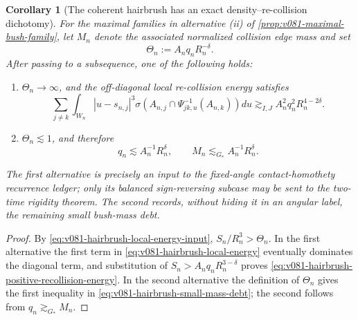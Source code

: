 \documentclass[10pt]{article}
\newtheorem{corollary}[theorem]{Corollary}
\begin{document}
\begin{corollary}[The coherent hairbrush has an exact density--re-collision dichotomy]
\label{cor:v081-hairbrush-density-recollision-dichotomy}
For the maximal families in alternative \textnormal{(ii)} of
\cref{prop:v081-maximal-bush-family}, let \(M_n\) denote the associated normalized collision edge
mass and set
\[
\Theta_n:=A_nq_nR_n^{-\delta}.
\]
After passing to a subsequence, one of the following holds:
\begin{enumerate}[label=\textnormal{(\roman*)}]
\item \(\Theta_n\to\infty\), and the off-diagonal local re-collision energy satisfies
\begin{equation}
\label{eq:v081-hairbrush-positive-recollision-energy}
\boxed{
\sum_{j\ne k}
\int_{W_n}|u-s_{n,j}|^3
\sigma\!\left(
A_{n,j}\cap\Psi_{jk,u}^{-1}(A_{n,k})
\right)du
\gtrsim_{I,J}
A_n^2q_n^2R_n^{4-2\delta}.
}
\end{equation}
\item \(\Theta_n\lesssim1\), and therefore
\begin{equation}
\label{eq:v081-hairbrush-small-mass-debt}
\boxed{
q_n\lesssim A_n^{-1}R_n^\delta,
\qquad
M_n\lesssim_{G_*}A_n^{-1}R_n^\delta.
}
\end{equation}
\end{enumerate}
The first alternative is precisely an input to the fixed-angle contact-homothety recurrence ledger;
only its balanced sign-reversing subcase may be sent to the two-time rigidity theorem.  The second
records, without hiding it in an angular label, the remaining small bush-mass debt.
\end{corollary}

\begin{proof}
By \eqref{eq:v081-hairbrush-local-energy-input},
\(S_n/R_n^3>\Theta_n\).  In the first alternative the first term in
\eqref{eq:v081-hairbrush-local-energy} eventually dominates the diagonal term, and substitution of
\(S_n>A_nq_nR_n^{3-\delta}\) proves
\eqref{eq:v081-hairbrush-positive-recollision-energy}.  In the second alternative the definition
of \(\Theta_n\) gives the first inequality in
\eqref{eq:v081-hairbrush-small-mass-debt}; the second follows from
\(q_n\gtrsim_{G_*}M_n\).
\end{proof}
\end{document}
